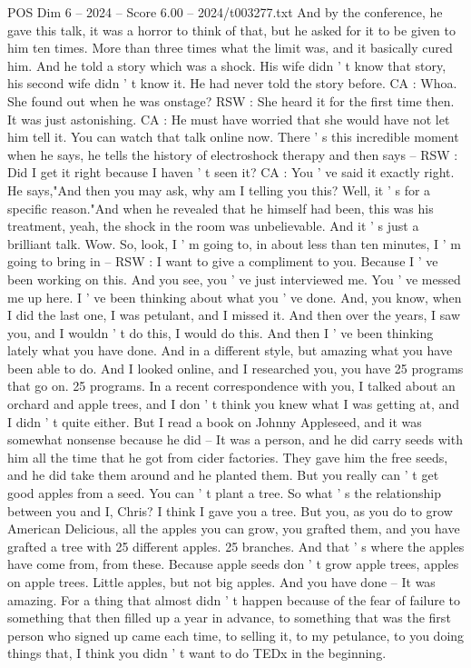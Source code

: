 \begin{textsample}{POS Dim 6 – 2024 – Score 6.00 – 2024/t003277.txt}
And by the conference, he gave this talk, it was a horror to think of that, but he asked for it to be given to him ten times.
More than three times what the limit was, and it basically cured him.
And he told a story which was a shock.
His wife didn ' t know that story, his second wife didn ' t know it.
He had never told the story before.
CA : Whoa.
She found out when he was onstage?
RSW : She heard it for the first time then.
It was just astonishing.
CA : He must have worried that she would have not let him tell it.
You can watch that talk online now.
There ' s this incredible moment when he says, he tells the history of electroshock therapy and then says -- RSW : Did I get it right because I haven ' t seen it?
CA : You ' ve said it exactly right.
He says,"And then you may ask, why am I telling you this?
Well, it ' s for a specific reason."And when he revealed that he himself had been, this was his treatment, yeah, the shock in the room was unbelievable.
And it ' s just a brilliant talk.
Wow.
So, look, I ' m going to, in about less than ten minutes, I ' m going to bring in -- RSW : I want to give a compliment to you.
Because I ' ve been working on this.
And you see, you ' ve just interviewed me.
You ' ve messed me up here.
I ' ve been thinking about what you ' ve done.
And, you know, when I did the last one, I was petulant, and I missed it.
And then over the years, I saw you, and I wouldn ' t do this, I would do this.
And then I ' ve been thinking lately what you have done.
And in a different style, but amazing what you have been able to do.
And I looked online, and I researched you, you have 25 programs that go on. 25 programs.
In a recent correspondence with you, I talked about an orchard and apple trees, and I don ' t think you knew what I was getting at, and I didn ' t quite either.
But I read a book on Johnny Appleseed, and it was somewhat nonsense because he did -- It was a person, and he did carry seeds with him all the time that he got from cider factories.
They gave him the free seeds, and he did take them around and he planted them.
But you really can ' t get good apples from a seed.
You can ' t plant a tree.
So what ' s the relationship between you and I, Chris?
I think I gave you a tree.
But you, as you do to grow American Delicious, all the apples you can grow, you grafted them, and you have grafted a tree with 25 different apples. 25 branches.
And that ' s where the apples have come from, from these.
Because apple seeds don ' t grow apple trees, apples on apple trees.
Little apples, but not big apples.
And you have done -- It was amazing.
For a thing that almost didn ' t happen because of the fear of failure to something that then filled up a year in advance, to something that was the first person who signed up came each time, to selling it, to my petulance, to you doing things that, I think you didn ' t want to do TEDx in the beginning.

\end{textsample}

